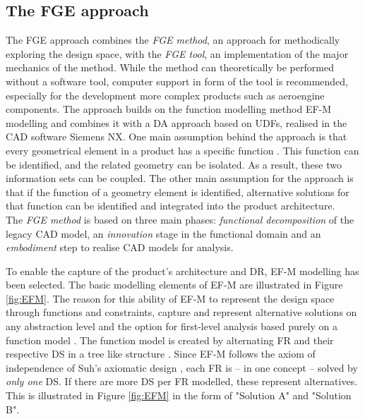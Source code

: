 \documentclass[aerospace,article,submit,moreauthors,pdftex]{Definitions/mdpi}
\begin{document}
\subsection{The FGE approach}\label{sec:omfgDSE}
The \acf{FGE} approach combines the \textit{FGE method}, an approach for methodically exploring the design space, with the \textit{FGE tool}, an implementation of the major mechanics of the method.
While the method can theoretically be performed without a software tool, computer support in form of the tool is recommended, especially for the development more complex products such as aeroengine components.
The approach builds on the function modelling method \ac{EF-M} modelling and combines it with a \ac{DA} approach based on \acp{UDF}, realised in the CAD software Siemens NX. 
One main assumption behind the approach is that every geometrical element in a product has a specific function \citep{Gero2004}.
This function can be identified, and the related geometry can be isolated.
As a result, these two information sets can be coupled. 
The other main assumption for the approach is that if the function of a geometry element is identified, alternative solutions for that function can be identified and integrated into the product architecture.
\\

The \textit{\ac{FGE} method} is based on three main phases: \textit{functional decomposition} of the legacy CAD model, an \textit{innovation} stage in the functional domain and an \textit{embodiment} step to realise CAD models for analysis.

To enable the capture of the product's architecture and \ac{DR}, \ac{EF-M} modelling has been selected. 
The basic modelling elements of \ac{EF-M} are illustrated in Figure \ref{fig:EFM}.
The reason for this ability of \ac{EF-M} to represent the design space through functions and constraints, capture and represent alternative solutions on any abstraction level and the option for first-level analysis based purely on a function model \cite{Muller2019Aiedam}.
The function model is created by alternating \ac{FR} and their respective \ac{DS} in a tree like structure \cite{Schachinger2000}.
Since \ac{EF-M} follows the axiom of independence of Suh's axiomatic design \cite{Suh1990}, each \ac{FR} is -- in one concept -- solved by \textit{only one} \ac{DS}. 
If there are more \ac{DS} per \ac{FR} modelled, these represent alternatives.
This is illustrated in Figure \ref{fig:EFM} in the form of "Solution A" and "Solution B".
\end{document}
